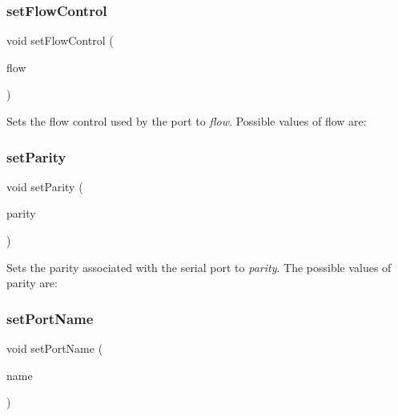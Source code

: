 \subsubsection{\texorpdfstring{setFlowControl}{setFlowControl}}
{\footnotesize\ttfamily void set\+Flow\+Control (\begin{DoxyParamCaption}\item[{Flow\+Type}]{flow }\end{DoxyParamCaption})\hspace{0.3cm}{\ttfamily [slot]}}

Sets the flow control used by the port to {\itshape flow}. Possible values of flow are\+: 
\begin{DoxyCode}{0}
\end{DoxyCode}
 \mbox{\label{class_qext_serial_port_ac9c0368ed4250c2c94dfc91778c23950}} 
\subsubsection{\texorpdfstring{setParity}{setParity}}
{\footnotesize\ttfamily void set\+Parity (\begin{DoxyParamCaption}\item[{Parity\+Type}]{parity }\end{DoxyParamCaption})\hspace{0.3cm}{\ttfamily [slot]}}

Sets the parity associated with the serial port to {\itshape parity}. The possible values of parity are\+: 
\begin{DoxyCode}{0}
\end{DoxyCode}
 \mbox{\label{class_qext_serial_port_ae390a8f30cec40fe28b324820a494ae3}} 
\subsubsection{\texorpdfstring{setPortName}{setPortName}}
{\footnotesize\ttfamily void set\+Port\+Name (\begin{DoxyParamCaption}\item[{const Q\+String \&}]{name }\end{DoxyParamCaption})\hspace{0.3cm}{\ttfamily [slot]}}


